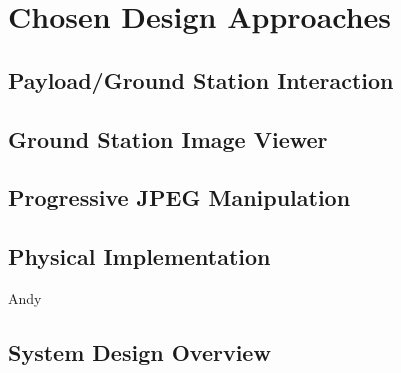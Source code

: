 \chapter{Chosen Design Approaches}




\section{Payload/Ground Station Interaction}

\section{Ground Station Image Viewer}

\section{Progressive JPEG Manipulation}

\section{Physical Implementation}
Andy

\section{System Design Overview}

